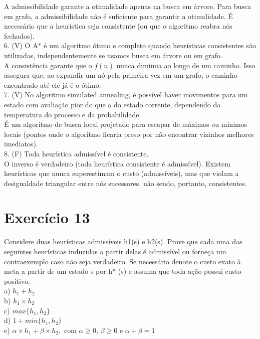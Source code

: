\documentclass[a4paper,12pt]{article}
\begin{document}
A admissibilidade garante a otimalidade apenas na busca em árvore. Para busca em grafo, a admissibilidade não é suficiente para garantir a otimalidade. É necessário que a heurística seja consistente (ou que o algoritmo reabra nós fechados). \\

6. (V) O A* é um algoritmo ótimo e completo quando heurísticas consistentes são utilizadas, independentemente se usamos busca em árvore ou em grafo.\\

A consistência garante que o $f(n)$ nunca diminua ao longo de um caminho. Isso assegura que, ao expandir um nó pela primeira vez em um grafo, o caminho encontrado até ele já é o ótimo.\\

7. (V) No algoritmo simulated annealing, é possível haver movimentos para um estado com avaliação pior do que a do estado corrente, dependendo da temperatura do processo e da probabilidade.\\

É um algoritmo de busca local projetado para escapar de máximos ou mínimos locais (pontos onde o algoritmo ficaria preso por não encontrar vizinhos melhores imediatos).\\

8. (F) Toda heurística admissível é consistente.\\

O inverso é verdadeiro (toda heurística consistente é admissível). Existem heurísticas que nunca superestimam o custo (admissíveis), mas que violam a desigualdade triangular entre nós sucessores, não sendo, portanto, consistentes.



\newpage
\section*{Exercício 13}

Considere duas heurísticas admissíveis h1(s) e h2(s). Prove que cada
uma das seguintes heurísticas induzidas a partir delas é admissível ou forneça um contraexemplo
caso não seja verdadeiro. Se necessário denote o custo exato à meta a partir de um
estado s por h* (s) e assuma que toda ação possui custo positivo.\\

a) $h_1 + h_2$\\
b) $h_1 \times h_2$\\
c) $max\{h_1, h_2\}$\\
d) $1 + min\{h_1, h_2\}$\\
e) $\alpha \times h_1 + \beta \times h_2,$ com $\alpha \geq 0$, $\beta \geq 0$ e $\alpha + \beta = 1$\\
\end{document}

